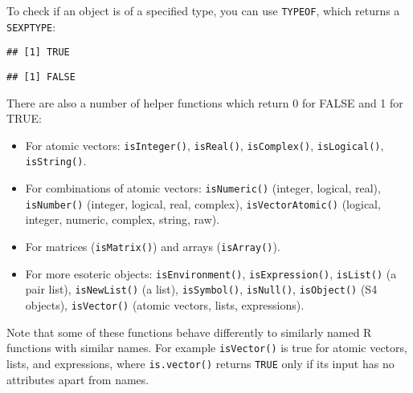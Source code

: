 To check if an object is of a specified type, you can use
\texttt{TYPEOF}, which returns a \texttt{SEXPTYPE}:

\begin{Shaded}
\begin{Highlighting}[]
\StringTok{ }\NormalTok{(}\NormalTok{(}\NormalTok{ =}\NormalTok{), }
\NormalTok{)}
\NormalTok{(}\NormalTok{)}
\end{Highlighting}
\end{Shaded}

\begin{verbatim}
## [1] TRUE
\end{verbatim}

\begin{Shaded}
\begin{Highlighting}[]
\NormalTok{(}\NormalTok{)}
\end{Highlighting}
\end{Shaded}

\begin{verbatim}
## [1] FALSE
\end{verbatim}

There are also a number of helper functions which return 0 for FALSE and
1 for TRUE:

\begin{itemize}
\item
  For atomic vectors: \texttt{isInteger()}, \texttt{isReal()},
  \texttt{isComplex()}, \texttt{isLogical()}, \texttt{isString()}.
\item
  For combinations of atomic vectors: \texttt{isNumeric()} (integer,
  logical, real), \texttt{isNumber()} (integer, logical, real, complex),
  \texttt{isVectorAtomic()} (logical, integer, numeric, complex, string,
  raw).
\item
  For matrices (\texttt{isMatrix()}) and arrays (\texttt{isArray()}).
\item
  For more esoteric objects: \texttt{isEnvironment()},
  \texttt{isExpression()}, \texttt{isList()} (a pair list),
  \texttt{isNewList()} (a list), \texttt{isSymbol()}, \texttt{isNull()},
  \texttt{isObject()} (S4 objects), \texttt{isVector()} (atomic vectors,
  lists, expressions).
\end{itemize}

Note that some of these functions behave differently to similarly named
R functions with similar names. For example \texttt{isVector()} is true
for atomic vectors, lists, and expressions, where \texttt{is.vector()}
returns \texttt{TRUE} only if its input has no attributes apart from
names.

